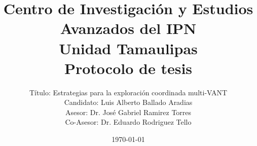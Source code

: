 \documentclass[11pt,epsf,times]{article}
\title{ Centro de Investigaci\'{o}n y Estudios Avanzados del IPN\\
  Unidad Tamaulipas\\
  \textbf{Protocolo de tesis}
}
\author{
Título: Estrategias para la exploración coordinada multi-VANT \\
Candidato: Luis Alberto Ballado Aradias \\
Asesor: Dr. José Gabriel Ramirez Torres \\
Co-Asesor: Dr. Eduardo Rodriguez Tello
}
\date{\today}
\begin{document}
\maketitle

\begin{abstract}




\end{abstract}
\end{document}
